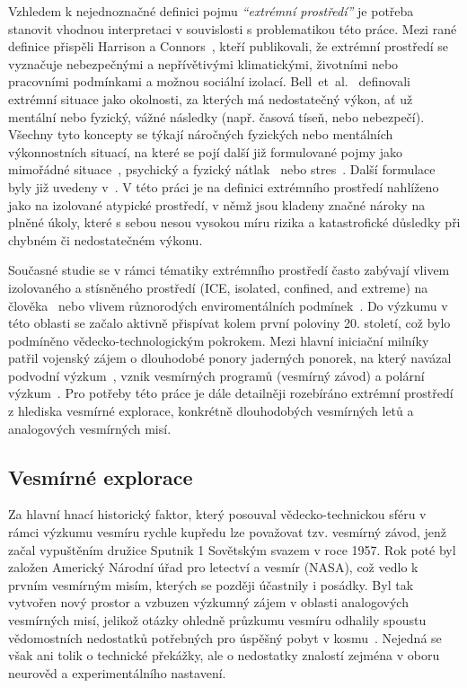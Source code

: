 Vzhledem k nejednoznačné definici pojmu \textit{\enquote{extrémní prostředí}} je
potřeba stanovit vhodnou interpretaci v souvislosti s problematikou této práce.
Mezi rané definice přispěli Harrison a Connors~\cite{harrison1984}, kteří
publikovali, že extrémní prostředí se vyznačuje nebezpečnými a nepřívětivými
klimatickými, životními nebo pracovními podmínkami a možnou sociální izolací.
Bell~et~al.~\cite{bell2016} definovali extrémní situace jako okolnosti, za
kterých má nedostatečný výkon, ať už mentální nebo fyzický, vážné následky
(např. časová tíseň, nebo nebezpečí). Všechny tyto koncepty se týkají náročných
fyzických nebo mentálních výkonnostních situací, na které se pojí další již
formulované pojmy jako mimořádné
situace~\cite{stachowski2009benefits,yu2008misery}, psychický a fyzický
nátlak~\cite{gardner2012performance} nebo stres~\cite{Staal2013StressCA}. Další
formulace byly již uvedeny
v~\cite{hannah2009framework,hallgren2018matter,golden2018teams}. V této práci je
na definici extrémního prostředí nahlíženo jako na izolované atypické prostředí,
v němž jsou kladeny značné nároky na plněné úkoly, které s sebou nesou vysokou
míru rizika a katastrofické důsledky při chybném či nedostatečném výkonu.

Současné studie se v rámci tématiky extrémního prostředí často zabývají vlivem
izolovaného a stísněného prostředí (\gls{ICE}, isolated, confined, and extreme)
na člověka~\cite{Pagel2016,golden2018teams} nebo vlivem různorodých
enviromentálních podmínek~\cite{Taylor2016,Winnard2019,Zhang2019}. Do výzkumu v
této oblasti se začalo aktivně přispívat kolem první poloviny 20. století, což
bylo podmíněno vědecko-technologickým pokrokem. Mezi hlavní iniciační milníky
patřil vojenský zájem o dlouhodobé ponory jaderných ponorek, na který navázal
podvodní výzkum~\cite{Maynard2018,Driskell2018}, vznik vesmírných programů
(vesmírný závod) a polární výzkum~\cite{wickman2008,stuster2007bold}. Pro
potřeby této práce je dále detailněji rozebíráno extrémní prostředí z hlediska
vesmírné explorace, konkrétně dlouhodobých vesmírných letů a analogových
vesmírných misí.

\subsection{Vesmírné explorace}
\label{subsection:vesmirne_explorace}
Za hlavní hnací historický faktor, který posouval vědecko-technickou sféru v
rámci výzkumu vesmíru rychle kupředu lze považovat tzv. vesmírný závod, jenž
začal vypuštěním družice Sputnik 1 Sovětským svazem v roce 1957. Rok poté byl
založen Americký Národní úřad pro letectví a vesmír (\gls{NASA}), což vedlo k
prvním vesmírným misím, kterých se později účastnily i posádky. Byl tak vytvořen
nový prostor a vzbuzen výzkumný zájem v oblasti analogových vesmírných misí,
jelikož otázky ohledně průzkumu vesmíru odhalily spoustu vědomostních nedostatků
potřebných pro úspěšný pobyt v kosmu~\cite{Driskell2018}. Nejedná se však ani
tolik o technické překážky, ale o nedostatky znalostí zejména v oboru neurověd a
experimentálního nastavení.

